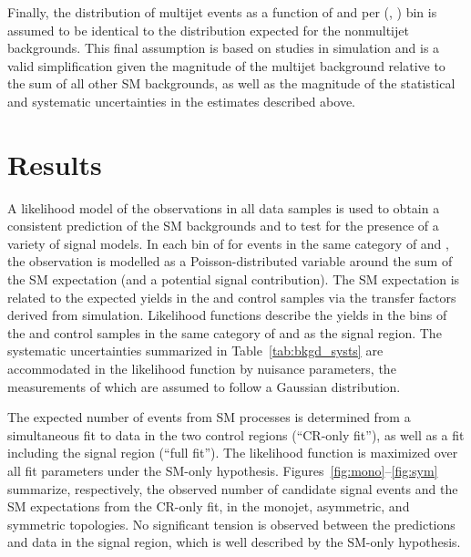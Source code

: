 Finally, the distribution of multijet events as a function of \nb and
\mht per (\njet, \scalht) bin is assumed to be identical to the
distribution expected for the nonmultijet backgrounds. This final
assumption is based on studies in simulation and is a valid
simplification given the magnitude of the multijet background relative
to the sum of all other SM backgrounds, as well as the magnitude of
the statistical and systematic uncertainties in the estimates
described above.


\clearpage
\section{Results}
\label{sec:result}

A likelihood model of the observations in all data samples is used to
obtain a consistent prediction of the SM backgrounds and to test for
the presence of a variety of signal models.  In each bin of \scalht
for events in the same category of \njet and \nb, the observation is
modelled as a Poisson-distributed variable around the sum of the SM
expectation (and a potential signal contribution). The SM expectation
is related to the expected yields in the \mj and \mmj control samples
via the transfer factors derived from simulation. Likelihood functions
describe the yields in the \scalht bins of the \mj and \mmj control
samples in the same category of \njet and \nb as the signal
region. The systematic uncertainties summarized in
Table~\ref{tab:bkgd_systs} are accommodated in the likelihood function
by nuisance parameters, the measurements of which are assumed to
follow a Gaussian distribution.

The expected number of events from SM processes is determined from a
simultaneous fit to data in the two control regions (``CR-only fit''),
as well as a fit including the signal region (``full fit''). The
likelihood function is maximized over all fit parameters under the
SM-only hypothesis. Figures~\ref{fig:mono}--\ref{fig:sym} summarize,
respectively, the observed number of candidate signal events and the
SM expectations from the CR-only fit, in the monojet, asymmetric, and
symmetric topologies. No significant tension is observed between the
predictions and data in the signal region, which is well described by
the SM-only hypothesis.

